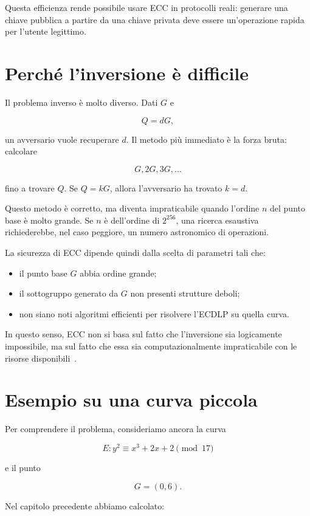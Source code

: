 \documentclass[12pt,a4paper,oneside]{report}
\begin{document}
Questa efficienza rende possibile usare ECC in protocolli reali: generare una chiave pubblica a partire da una chiave privata deve essere un'operazione rapida per l'utente legittimo.

\section{Perché l'inversione è difficile}

Il problema inverso è molto diverso. Dati \(G\) e

\[
Q=dG,
\]

un avversario vuole recuperare \(d\). Il metodo più immediato è la forza bruta: calcolare

\[
G, 2G, 3G, \ldots
\]

fino a trovare \(Q\). Se \(Q=kG\), allora l'avversario ha trovato \(k=d\).

Questo metodo è corretto, ma diventa impraticabile quando l'ordine \(n\) del punto base è molto grande. Se \(n\) è dell'ordine di \(2^{256}\), una ricerca esaustiva richiederebbe, nel caso peggiore, un numero astronomico di operazioni.

La sicurezza di ECC dipende quindi dalla scelta di parametri tali che:

\begin{itemize}
    \item il punto base \(G\) abbia ordine grande;
    \item il sottogruppo generato da \(G\) non presenti strutture deboli;
    \item non siano noti algoritmi efficienti per risolvere l'ECDLP su quella curva.
\end{itemize}

In questo senso, ECC non si basa sul fatto che l'inversione sia logicamente impossibile, ma sul fatto che essa sia computazionalmente impraticabile con le risorse disponibili~\cite{margara_complessita,sec1}.

\section{Esempio su una curva piccola}

Per comprendere il problema, consideriamo ancora la curva

\[
E: y^2 \equiv x^3 + 2x + 2 \pmod{17}
\]

e il punto

\[
G=(0,6).
\]

Nel capitolo precedente abbiamo calcolato:
\end{document}
